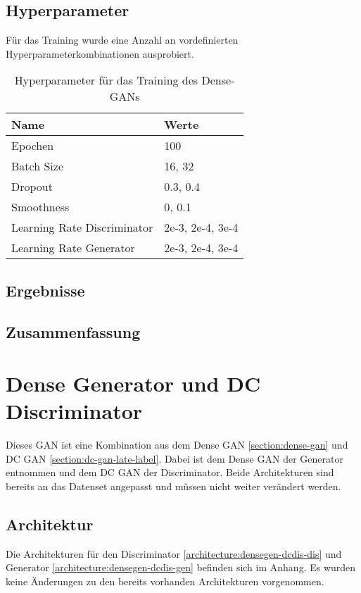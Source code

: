 \subsection{Hyperparameter}
Für das Training wurde eine Anzahl an vordefinierten Hyperparameterkombinationen ausprobiert.

\begin{table}[H]
	\centering
	\begin{tabular}{l l}
		Name                        & Werte            \\ \hline
		Epochen                     & 100              \\
		Batch Size                  & 16, 32           \\
		Dropout                     & 0.3, 0.4         \\
		Smoothness                  & 0, 0.1           \\
		Learning Rate Discriminator & 2e-3, 2e-4, 3e-4 \\
		Learning Rate Generator     & 2e-3, 2e-4, 3e-4
	\end{tabular}
	\caption{Hyperparameter für das Training des Dense-GANs}
\end{table}

\subsection{Ergebnisse}
\subsection{Zusammenfassung}

\section{Dense Generator und DC Discriminator}
Dieses GAN ist eine Kombination aus dem Dense GAN \cref{section:dense-gan} und DC GAN \cref{section:dc-gan-late-label}.
Dabei ist dem Dense GAN der Generator entnommen und dem DC GAN der Discriminator.
Beide Architekturen sind bereits an das Datenset angepasst und müssen nicht weiter verändert werden.

\subsection{Architektur}
Die Architekturen für den Discriminator \cref{architecture:densegen-dcdis-dis} und Generator \cref{architecture:densegen-dcdis-gen} befinden sich im Anhang.
Es wurden keine Änderungen zu den bereits vorhanden Architekturen vorgenommen.

